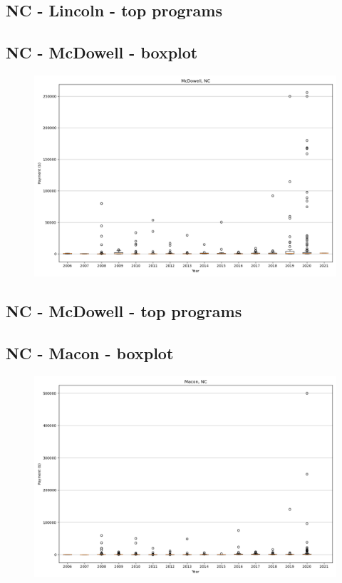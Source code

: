 \subsection*{NC - Lincoln - top programs}

\newpage
\subsection*{NC - McDowell - boxplot}
\begin{figure}[h]
\centering
\includegraphics[width=7in]{../output/boxplots/counties/McDowell-NC_boxplot.png}
\end{figure}


\subsection*{NC - McDowell - top programs}

\newpage
\subsection*{NC - Macon - boxplot}
\begin{figure}[h]
\centering
\includegraphics[width=7in]{../output/boxplots/counties/Macon-NC_boxplot.png}
\end{figure}


